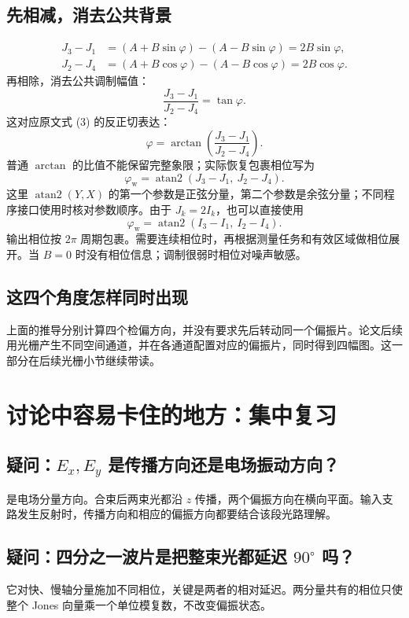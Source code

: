 \documentclass[UTF8,fontset=fandol,11pt,a4paper]{ctexart}
\newcommand{\quest}[2]{\subsection*{疑问：#1}#2}
\begin{document}
\subsection{先相减，消去公共背景}
\begin{align}
J_3-J_1
&=(A+B\sin\varphi)-(A-B\sin\varphi)
=2B\sin\varphi,\\
J_2-J_4
&=(A+B\cos\varphi)-(A-B\cos\varphi)
=2B\cos\varphi.
\end{align}
再相除，消去公共调制幅值：
\begin{equation}
\frac{J_3-J_1}{J_2-J_4}=\tan\varphi.
\end{equation}
这对应原文式 (3) 的反正切表达：
\begin{equation}
\varphi=\arctan\left(\frac{J_3-J_1}{J_2-J_4}\right).
\end{equation}
普通 $\arctan$ 的比值不能保留完整象限；实际恢复包裹相位写为
\begin{equation}
\boxed{\varphi_{\mathrm w}=\operatorname{atan2}(J_3-J_1,\ J_2-J_4).}
\end{equation}
这里 $\operatorname{atan2}(Y,X)$ 的第一个参数是正弦分量，第二个参数是余弦分量；不同程序接口使用时核对参数顺序。由于 $J_k=2I_k$，也可以直接使用
\begin{equation}
\boxed{\varphi_{\mathrm w}=\operatorname{atan2}(I_3-I_1,\ I_2-I_4).}
\end{equation}
输出相位按 $2\pi$ 周期包裹。需要连续相位时，再根据测量任务和有效区域做相位展开。当 $B=0$ 时没有相位信息；调制很弱时相位对噪声敏感。

\subsection{这四个角度怎样同时出现}
上面的推导分别计算四个检偏方向，并没有要求先后转动同一个偏振片。论文后续用光栅产生不同空间通道，并在各通道配置对应的偏振片，同时得到四幅图。这一部分在后续光栅小节继续带读。

\clearpage
\section{讨论中容易卡住的地方：集中复习}
\quest{$E_x,E_y$ 是传播方向还是电场振动方向？}{
是电场分量方向。合束后两束光都沿 $z$ 传播，两个偏振方向在横向平面。输入支路发生反射时，传播方向和相应的偏振方向都要结合该段光路理解。}

\quest{四分之一波片是把整束光都延迟 $90^\circ$ 吗？}{
它对快、慢轴分量施加不同相位，关键是两者的相对延迟。两分量共有的相位只使整个 Jones 向量乘一个单位模复数，不改变偏振状态。}
\end{document}
